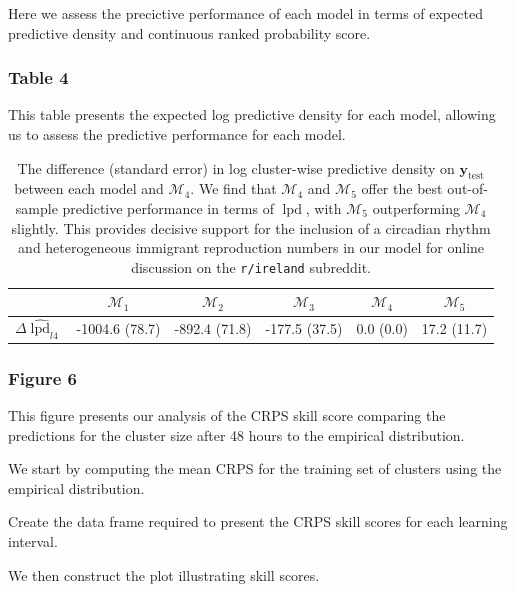 \documentclass[
]{article}
\begin{document}
Here we assess the precictive performance of each model in terms of
expected predictive density and continuous ranked probability score.

\hypertarget{table-4}{%
\subsubsection{Table 4}\label{table-4}}

This table presents the expected log predictive density for each model,
allowing us to assess the predictive performance for each model.

\begin{table}[ht]
\centering
\begin{tabular}{|c|c|c|c|c|c|}
  \hline
 & $\mathcal {M}_1$ & $\mathcal {M}_2$ & $\mathcal {M}_3$ & $\mathcal {M}_4$ & $\mathcal {M}_5$ \\ 
  \hline
$\Delta \widehat{\operatorname{lpd}}_{l4}$ & -1004.6 (78.7) & -892.4 (71.8) & -177.5 (37.5) & 0.0 (0.0) & 17.2 (11.7) \\ 
   \hline
\end{tabular}
\caption{The difference (standard error) in log cluster-wise predictive density on $\boldsymbol y_{\operatorname{test}}$ between each model and $\mathcal M_4$. We find that $\mathcal M_4$ and $\mathcal M_5$ offer the best out-of-sample predictive performance in terms of $\operatorname{lpd}$, with $\mathcal M_5$ outperforming $\mathcal M_4$ slightly. This provides decisive support for the inclusion of a circadian rhythm and heterogeneous immigrant reproduction numbers in our model for online discussion on the \texttt{r/ireland} subreddit.} 
\label{tab:lpd}
\end{table}

\hypertarget{figure-6}{%
\subsubsection{Figure 6}\label{figure-6}}

This figure presents our analysis of the CRPS skill score comparing the
predictions for the cluster size after 48 hours to the empirical
distribution.

We start by computing the mean CRPS for the training set of clusters
using the empirical distribution.

Create the data frame required to present the CRPS skill scores for each
learning interval.

We then construct the plot illustrating skill scores.
\end{document}

